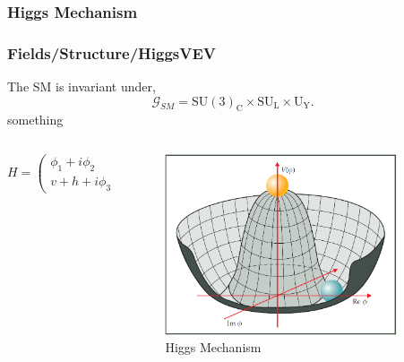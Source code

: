\documentclass[10pt,xcolor=dvipsnames,mathserif]{beamer}
\begin{document}
\begin{frame}
\frametitle{Higgs Mechanism}

\frametitle{Fields/Structure/HiggsVEV}
%
The SM is invariant under, 
%
\begin{equation}
\mathcal{G}_{SM} = \mathrm{SU}(3)_{\mathrm{C}} \times \mathrm{SU}_{\text{L}} \times \mathrm{U}_{\text{Y}}   .
\label{eq:SM_Group}
\end{equation} 
%
something
\begin{columns}
	\begin{column}{.55\textwidth}%
		\begin{equation}
		H = \begin{pmatrix}
		\phi_1 + i \phi_2 \\ 
		v + h + i \phi_3 
		\end{pmatrix}   \rightarrow  \langle H  \rangle =  \frac{1}{\sqrt{2}} \begin{pmatrix}
		0 \\ 
		v + h 
		\end{pmatrix}  .
		\label{shame}
		\nonumber
		\end{equation}
	\end{column}%
	\begin{column}{.45\textwidth}%
		\begin{figure}
			\centering
			\includegraphics[width=0.9\textwidth,keepaspectratio]{SM/HiggsPot.png}
			\caption{Higgs Mechanism}
		\end{figure}
	
	\end{column}%
\end{columns}

\end{frame}
\end{document}
